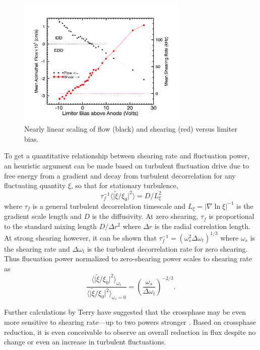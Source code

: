\documentclass[%
 aip,
 amsmath,amssymb,
 preprint,%
]{revtex4-1}
\begin{document}
\begin{figure}
\begin{center}
\includegraphics[width=8cm]{flowandshear.png}%
\end{center}
\caption{\label{fig:flowandshear} Nearly linear scaling of flow (black) and shearing (red) versus limiter bias.}
\end{figure}

To get a quantitative relationship between shearing rate and fluctuation power, an heuristic argument can be made \cite{biglari90} based on turbulent fluctuation drive due to free energy from a gradient and decay from turbulent decorrelation for any fluctuating quantity $\xi$, so that for stationary turbulence,
\begin{equation}
\tau_{f}^{-1} \langle \lvert \tilde{\xi}/\xi_{0} \rvert ^{2} \rangle = D/L_{\xi}^{2}
\label{eq:flucsbalance}
\end{equation}
where $\tau_{f}$ is a general turbulent decorrelation timescale and $L_{\xi} = \lvert \nabla \ln \xi \rvert ^{-1}$ is the gradient scale length and $D$ is the diffusivity. At zero shearing, $\tau_{f}$ is proportional to the standard mixing length $D/\Delta r^{2}$ where $\Delta r$ is the radial correlation length. At strong shearing however, it can be shown that $\tau_{f}^{-1} = (\omega_{s}^{2} \Delta \omega_{t})^{1/3}$ where $\omega_{s}$ is the shearing rate and $\Delta \omega_{t}$ is the turbulent decorrelation rate for zero shearing. Thus flucuation power normalized to zero-shearing power scales to shearing rate as
\begin{equation}
\frac{\langle \lvert \tilde{\xi}/\xi_{0} \rvert ^{2} \rangle _{\omega_{s}}}{\langle \lvert \tilde{\xi}/\xi_{0} \rvert ^{2} \rangle _{\omega_{s}=0}} = \left(\frac{\omega_{s}}{{\Delta \omega_{t}}}\right)^{-2/3}.
\label{eq:flucsvsshear}
\end{equation}

Further calculations by Terry have suggested that the crossphase may be even more sensitive to shearing rate---up to two powers stronger \cite{terry01}. Based on crossphase reduction, it is even conceivable to observe an overall reduction in flux despite no change or even an increase in turbulent fluctuations.
\end{document}
